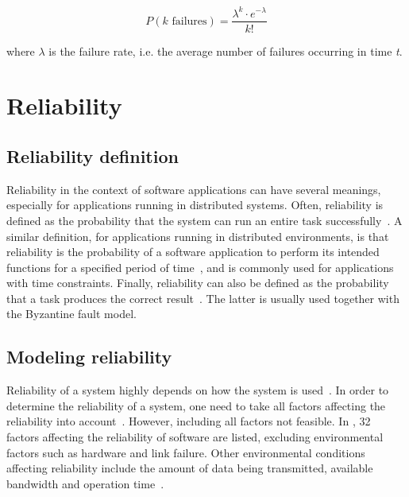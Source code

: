 \documentclass{cslthse-msc}
\begin{document}
\begin{equation} \label{eq:Poisson}
P(k \mbox{ failures}) = \dfrac{\lambda^k \cdot e^{-\lambda}}{k!}
\end{equation}

where $\lambda$ is the failure rate, i.e. the average number of failures occurring in time \emph{t}. 

\section{Reliability} \label{sec:background_reliability}
\subsection{Reliability definition} \label{subsec:background_reliability_definition}
Reliability in the context of software applications can have several meanings, especially for applications running in distributed systems. Often, reliability is defined as the probability that the system can run an entire task successfully~\cite{taskAllocation, relModelDistSimSystem, studyServiceRel, hierarchicalRelModeling, generalAlgoRelEval, realTimeRelAnalysis, perfRelNonMarkovian}. A similar definition, for applications running in distributed environments, is that reliability is the probability of a software application to perform its intended functions for a specified period of time~\cite{surveyReliabilityDistr, surveyRelPrediction, relDistApplications}, and is commonly used for applications with time constraints. Finally, reliability can also be defined as the probability that a task produces the correct result~\cite{surveyRelPrediction, relAndPerfGridServices, relGridServicePredConstraint, relModelWebServices, selfAdaptRel}. The latter is usually used together with the Byzantine fault model. 

\subsection{Modeling reliability} \label{subsec:background_modeling_rel}
Reliability of a system highly depends on how the system is used~\cite{surveyRelPrediction}. In order to determine the reliability of a system, one need to take all factors affecting the reliability into account~\cite{surveyReliabilityDistr}. However, including all factors not feasible. In \cite{factorsAffectingRel}, 32 factors affecting the reliability of software are listed, excluding environmental factors such as hardware and link failure. Other environmental conditions affecting reliability include the amount of data being transmitted, available bandwidth and operation time~\cite{cloudServiceRel, hierarchicalRelModeling}.
\end{document}

